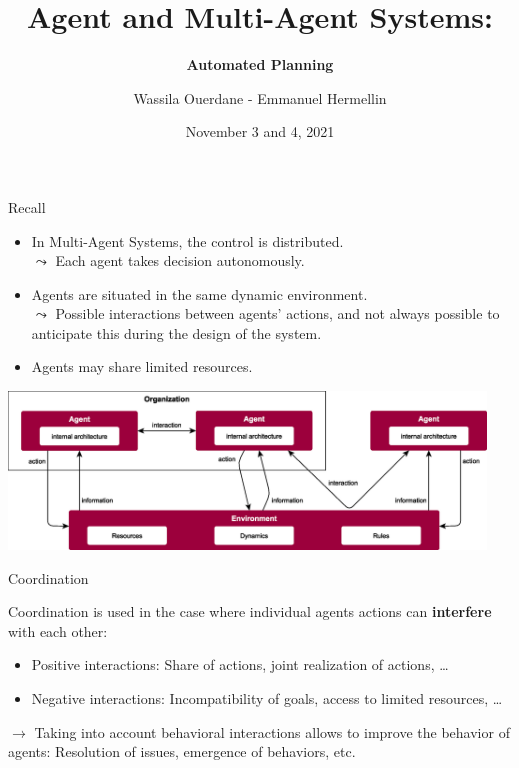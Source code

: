 \documentclass[9pt]{beamer}
\title[Multi-Agent Planning]{Agent and Multi-Agent Systems: }
\subtitle{{\bfseries \Large Automated Planning}}
\date{November 3 and 4, 2021}
\author[]{\vspace{2mm} Wassila Ouerdane - Emmanuel Hermellin}
\begin{document}
\begin{frame}
	\titlepage
\end{frame}

\begingroup
{}

\begin{frame}[noframenumbering]{Recall}
\begin{small}
\begin{itemize}
\item In Multi-Agent Systems, \textcolor{CS-1light}{the control is distributed}.\\
$\leadsto$ Each agent takes decision \textcolor{CS-1light}{autonomously}. 
\item Agents are situated in the same dynamic environment.\\ 
$\leadsto$ Possible \textcolor{CS-1light}{interactions} between agents' actions, and not always possible \textcolor{CS-1light}{to anticipate} this during the design of the system. 
\item Agents may share \textcolor{CS-1light}{limited resources}. 
\end{itemize}

\begin{center}
\includegraphics[keepaspectratio,width=0.95\textwidth]{images/mabs_details.eps}
\end{center}

\end{small}
\end{frame}

\begin{frame}[noframenumbering]{Coordination}
\begin{small}

Coordination is used in the case where individual agents actions can \textbf{interfere} with each other:
\begin{itemize}
\item \textcolor{CS-1light}{Positive interactions}: Share of actions, joint realization of actions, \dots
\item \textcolor{CS-1light}{Negative interactions}: Incompatibility of goals, access to limited resources, \dots
\end{itemize}

$\rightarrow$ Taking into account behavioral interactions allows to improve the behavior of agents: Resolution of issues, emergence of behaviors, etc. 

\end{small}
\end{frame}
\end{document}
